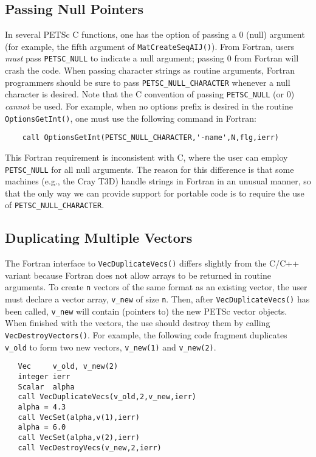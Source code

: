\subsection{Passing Null Pointers}

In several PETSc C functions, one has the option of passing a 0 (null)
argument (for example, the fifth argument of {\tt MatCreateSeqAIJ()}).
From Fortran, users {\em must} pass {\tt PETSC\_NULL} to indicate a
null argument;  passing 0 from Fortran will crash
the code.  When passing character strings as routine arguments,
Fortran programmers should be sure to pass {\tt PETSC\_NULL\_CHARACTER}
whenever a null character is  desired.  Note
that the C convention of passing {\tt PETSC\_NULL} (or 0) {\em cannot}
be used.  For example, when no options prefix is desired in the
routine {\tt OptionsGetInt()}, one must use the following command in
Fortran:
\begin{verbatim}
    call OptionsGetInt(PETSC_NULL_CHARACTER,'-name',N,flg,ierr)
\end{verbatim}

This Fortran requirement is inconsistent with C, where the 
user can employ {\tt PETSC\_NULL} for all null arguments. The reason
for this difference is that some machines (e.g., the Cray T3D)
handle strings in Fortran in an unusual manner, so that
the only way we can provide support for portable code
is to require the use of {\tt PETSC\_NULL\_CHARACTER}.

\subsection{Duplicating Multiple Vectors}
\label{sec:fortvecd}

The Fortran interface to {\tt VecDuplicateVecs()} differs slightly
from the C/C++ variant because Fortran does not allow arrays to be
returned in routine arguments.  To create {\tt n} vectors of the same
format as an existing vector, the user must declare a vector array,
{\tt v\_new} of size {\tt n}.  Then, after {\tt VecDuplicateVecs()} has
been called, {\tt v\_new} will contain (pointers to) the new PETSc
vector objects.  When finished with the vectors, the use should
destroy them by calling {\tt VecDestroyVectors()}.
 For example, the following code fragment
duplicates {\tt v\_old} to form two new vectors, {\tt v\_new(1)} and {\tt v\_new(2)}.
\begin{verbatim}
   Vec     v_old, v_new(2)
   integer ierr
   Scalar  alpha
   call VecDuplicateVecs(v_old,2,v_new,ierr)
   alpha = 4.3
   call VecSet(alpha,v(1),ierr)
   alpha = 6.0
   call VecSet(alpha,v(2),ierr)
   call VecDestroyVecs(v_new,2,ierr)
\end{verbatim}

